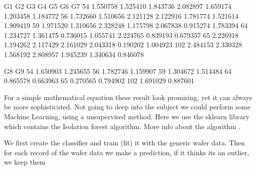 \documentclass[letterpaper,10pt,english]{jupyterBook}
\begin{document}
\begin{sphinxVerbatim}[commandchars=\\\{\}]
           G1        G2        G3        G4        G5        G6        G7  \PYGZbs{}
54  \PYGZhy{}1.550758 \PYGZhy{}1.525410 \PYGZhy{}1.843736 \PYGZhy{}2.082897 \PYGZhy{}1.659174 \PYGZhy{}1.203458 \PYGZhy{}1.184772   
56  \PYGZhy{}1.732660 \PYGZhy{}1.510656 \PYGZhy{}2.121128 \PYGZhy{}2.122916 \PYGZhy{}1.781774 \PYGZhy{}1.521614 \PYGZhy{}1.909419   
59  \PYGZhy{}1.971520 \PYGZhy{}1.310656 \PYGZhy{}2.328248 \PYGZhy{}1.175798 \PYGZhy{}2.067838 \PYGZhy{}0.915274 \PYGZhy{}1.783394   
64  \PYGZhy{}1.234727 \PYGZhy{}1.361475 \PYGZhy{}0.736015 \PYGZhy{}1.055741 \PYGZhy{}2.224765 \PYGZhy{}0.839193 \PYGZhy{}0.679357   
65  \PYGZhy{}2.226918 \PYGZhy{}1.194262 \PYGZhy{}2.117429 \PYGZhy{}2.161029 \PYGZhy{}2.043318 \PYGZhy{}0.190202 \PYGZhy{}1.004923   
102 \PYGZhy{}2.484153 \PYGZhy{}2.330328 \PYGZhy{}1.568192 \PYGZhy{}2.808957 \PYGZhy{}1.945239 \PYGZhy{}1.340634 \PYGZhy{}0.846078   

           G8        G9  
54  \PYGZhy{}1.650903 \PYGZhy{}1.245655  
56  \PYGZhy{}1.782746 \PYGZhy{}1.159907  
59  \PYGZhy{}1.304672 \PYGZhy{}1.514484  
64  \PYGZhy{}0.865578 \PYGZhy{}0.663963  
65  \PYGZhy{}0.270565 \PYGZhy{}0.794902  
102 \PYGZhy{}1.691029 \PYGZhy{}0.887601  
\end{sphinxVerbatim}

\sphinxAtStartPar
For a simple mathematical equation these result look promising, yet it can always be more sophisticated.
Not going to deep into the subject we could perform some Machine Learning, using a unsupervised method.
Here we use the sklearn library which contains the Isolation forest algorithm.
More info about the algorithm .

\begin{sphinxVerbatim}[commandchars=\\\{\}]
   
\end{sphinxVerbatim}

\sphinxAtStartPar
We first create the classifier and train (fit) it with the generic wafer data.
Then for each record of the wafer data we make a prediction, if it thinks its an outlier, we keep them

\begin{sphinxVerbatim}[commandchars=\\\{\}]
  
\PYG{p}{[}\PYG{p}{]}
\end{sphinxVerbatim}
\end{document}
